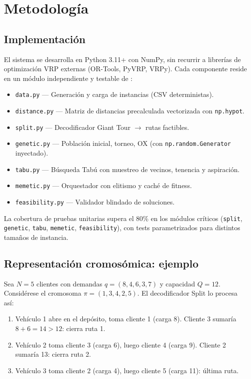 \section{Metodología}
\label{sec:metodologia}

\subsection{Implementación}

El sistema se desarrolla en Python 3.11+ con NumPy, sin recurrir a librerías de optimización VRP externas (OR-Tools, PyVRP, VRPy). Cada componente reside en un módulo independiente y testable de :

\begin{itemize}
    \item \texttt{data.py} — Generación y carga de instancias (CSV deterministas).
    \item \texttt{distance.py} — Matriz de distancias precalculada vectorizada con \texttt{np.hypot}.
    \item \texttt{split.py} — Decodificador Giant Tour $\to$ rutas factibles.
    \item \texttt{genetic.py} — Población inicial, torneo, OX (con \texttt{np.random.Generator} inyectado).
    \item \texttt{tabu.py} — Búsqueda Tabú con muestreo de vecinos, tenencia y aspiración.
    \item \texttt{memetic.py} — Orquestador con elitismo y caché de fitness.
    \item \texttt{feasibility.py} — Validador blindado de soluciones.
\end{itemize}

La cobertura de pruebas unitarias supera el 80\% en los módulos críticos (\texttt{split}, \texttt{genetic}, \texttt{tabu}, \texttt{memetic}, \texttt{feasibility}), con tests parametrizados para distintos tamaños de instancia.

\subsection{Representación cromosómica: ejemplo}

Sea $N = 5$ clientes con demandas $q = (8, 4, 6, 3, 7)$ y capacidad $Q = 12$. Considérese el cromosoma $\pi = (1, 3, 4, 2, 5)$. El decodificador Split lo procesa así:

\begin{enumerate}
    \item Vehículo 1 abre en el depósito, toma cliente 1 (carga 8). Cliente 3 sumaría $8 + 6 = 14 > 12$: cierra ruta 1.
    \item Vehículo 2 toma cliente 3 (carga 6), luego cliente 4 (carga 9). Cliente 2 sumaría 13: cierra ruta 2.
    \item Vehículo 3 toma cliente 2 (carga 4), luego cliente 5 (carga 11): última ruta.
\end{enumerate}


